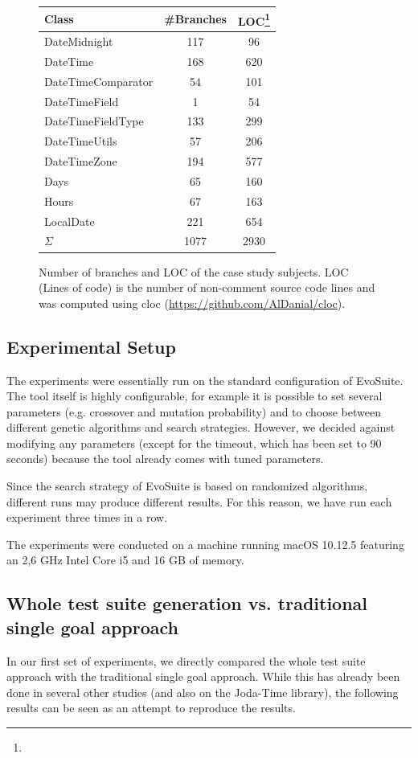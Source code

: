 \documentclass[pdftex,english,oribibl]{llncs}
\begin{document}
\begin{figure} 
\centering
\begin{tabular}{l c c} \hline
Class & \#Branches & LOC\footnote[1]{} \\ \hline
DateMidnight & 117 & 96 \\
DateTime & 168 & 620 \\
DateTimeComparator & 54 & 101 \\
DateTimeField & 1 & 54 \\
DateTimeFieldType & 133 & 299 \\
DateTimeUtils & 57 & 206 \\
DateTimeZone & 194 & 577 \\
Days & 65 & 160 \\
Hours & 67 & 163 \\
LocalDate & 221 & 654 \\ \hline
$\Sigma$&1077&2930 
\end{tabular}
\caption{Number of branches and LOC of the case study subjects. LOC (Lines of code) is the number of non-comment source code lines and was computed using cloc (\url{https://github.com/AlDanial/cloc}).\label{fig:subjects}}
\end{figure}

\subsection{Experimental Setup}
The experiments were essentially run on the standard configuration of EvoSuite. The tool itself is highly configurable, for example it is possible to set several parameters (e.g. crossover and mutation probability) and to choose between different genetic algorithms and search strategies. However, we decided against modifying any parameters (except for the timeout, which has been set to 90 seconds) because the tool already comes with tuned parameters. 

Since the search strategy of EvoSuite is based on randomized algorithms, different runs may produce different results. For this reason, we have run each experiment three times in a row.

The experiments were conducted on a machine running macOS 10.12.5 featuring an 2,6 GHz Intel Core i5 and 16 GB of memory.

\subsection{Whole test suite generation vs. traditional single goal approach}
In our first set of experiments, we directly compared the whole test suite approach with the traditional single goal approach. While this has already been done in several other studies (and also on the Joda-Time library), the following results can be seen as an attempt to reproduce the results.
\end{document}
